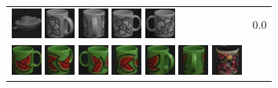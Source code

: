 {\begin{figure}[p]
\begin{tabular}{m{11cm} | m{3cm} |}
\includegraphics[width=1cm]{coil/beeld-29.eps}
\includegraphics[width=1cm]{coil/beeld-49.eps}
\includegraphics[width=1cm]{coil/beeld-50.eps}
\includegraphics[width=1cm]{coil/beeld-48.eps}
\includegraphics[width=1cm]{coil/beeld-51.eps}
& {\scriptsize 0.0}
\\
\includegraphics[width=1cm]{coil/beeld-30.eps}
\includegraphics[width=1cm]{coil/beeld-33.eps}
\includegraphics[width=1cm]{coil/beeld-31.eps}
\includegraphics[width=1cm]{coil/beeld-32.eps}
\includegraphics[width=1cm]{coil/beeld-34.eps}
\includegraphics[width=1cm]{coil/beeld-35.eps}
\includegraphics[width=1cm]{coil/beeld-62.eps}

\end{tabular}
\end{figure}}
